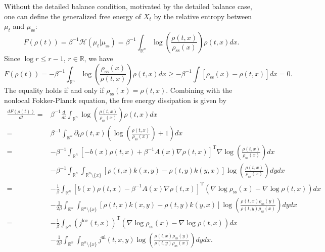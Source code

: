 \documentclass[10pt]{article}
\theoremstyle{definition}
\numberwithin{equation}{section}
\begin{document}
Without the detailed balance condition, motivated by the detailed balance case, one can define the generalized free energy of $X_t$ by the relative entropy between $\mu_{t}$ and $\mu_\mathrm{ss}$:
\begin{equation*}
    F(\rho(t)) = \beta^{-1}\mathcal{H}(\mu_{t} | \mu_\mathrm{ss}) = \beta^{-1}\int_{\mathbb{R}^n} \log \left( \frac{\rho(t,x)}{\rho_\mathrm{ss}(x)} \right)\rho(t,x)dx.
\end{equation*}
Since $\log r \leq r-1$, $r\in \mathbb{R}$, we have
\begin{equation*}
    F(\rho(t)) =   -\beta^{-1}\int_{\mathbb{R}^n} \log \left( \frac{\rho_\mathrm{ss}(x)}{\rho(t,x)} \right)\rho(t,x)dx \geq -\beta^{-1}\int [\rho_\mathrm{ss}(x) - \rho(t,x)]dx = 0.
\end{equation*}
The equality holds if and only if $\rho_\mathrm{ss}(x) = \rho(t,x)$. Combining with the nonlocal Fokker-Planck equation, the free energy dissipation is given by
\begin{align}\label{FEdiss}
   \frac{dF(\rho(t))}{dt}
   = & \beta^{-1}\frac{d}{dt} \int_{\mathbb{R}^n} \log \left( \frac{\rho(t,x)}{\rho_\mathrm{ss}(x)}\right)\rho(t,x)dx \nonumber\\
   = & \beta^{-1}\int_{\mathbb{R}^n} \partial_t \rho(t,x) \left(\log \left( \frac{\rho(t,x)}{\rho_\mathrm{ss}(x)} \right) +1\right) dx \nonumber\\
   = & -\beta^{-1}\int_{\mathbb{R}^n} [ -b(x)\rho(t,x) + \beta^{-1} A(x)\nabla \rho(t,x)]^\mathrm{T}\nabla \log \left( \frac{\rho(t,x)}{\rho_\mathrm{ss}(x)} \right)dx \nonumber \\
   & - \beta^{-1}\int_{\mathbb{R}^n}\int_{\mathbb{R}^n \setminus \{x\}} [\rho(t,x)k(x,y) - \rho(t,y)k(y,x)]\log \left( \frac{\rho(t,x)}{\rho_\mathrm{ss}(x)} \right) dydx \nonumber\\
   = & -\frac{1}{\beta}\int_{\mathbb{R}^n} [ b(x)\rho(t,x) - \beta^{-1} A(x)\nabla \rho(t,x)]^\mathrm{T}(\nabla \log\rho_\mathrm{ss}(x) - \nabla \log\rho(t,x)) dx \nonumber \\
   & - \frac{1}{2\beta}\int_{\mathbb{R}^n}\int_{\mathbb{R}^n \setminus \{x\}} [\rho(t,x)k(x,y) - \rho(t,y)k(y,x)]\log \left( \frac{\rho(t,x) \rho_\mathrm{ss}(y)}{\rho(t,y)\rho_\mathrm{ss}(x)} \right) dydx \nonumber\\
    = & -\frac{1}{\beta}\int_{\mathbb{R}^n} (j^\mathrm{loc}(t,x))^\mathrm{T}(\nabla \log\rho_\mathrm{ss}(x) - \nabla \log\rho(t,x)) dx \nonumber \\
    & - \frac{1}{2\beta}\int_{\mathbb{R}^n}\int_{\mathbb{R}^n \setminus \{x\}} j^\mathrm{nl}(t,x,y)\log \left( \frac{\rho(t,x) \rho_\mathrm{ss}(y)}{\rho(t,y)\rho_\mathrm{ss}(x)} \right) dydx.
\end{align}
\end{document}
